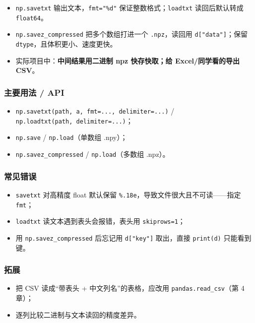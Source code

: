 \begin{itemize}
\tightlist
\item
  \texttt{np.savetxt} 输出文本，\texttt{fmt="\%d"}
  保证整数格式；\texttt{loadtxt} 读回后默认转成 \texttt{float64}。
\item
  \texttt{np.savez\_compressed} 把多个数组打进一个 \texttt{.npz}，读回用
  \texttt{d{[}"data"{]}}；保留 \texttt{dtype}，且体积更小、速度更快。
\item
  实际项目中：\textbf{中间结果用二进制 npz 快存快取；给
  Excel/同学看的导出 CSV}。
\end{itemize}

\subsubsection{主要用法 / API}\label{ux4e3bux8981ux7528ux6cd5-api-5}

\begin{itemize}
\tightlist
\item
  \texttt{np.savetxt(path,\ a,\ fmt=...,\ delimiter=...)} /
  \texttt{np.loadtxt(path,\ delimiter=...)}；
\item
  \texttt{np.save} / \texttt{np.load}（单数组 .npy）；
\item
  \texttt{np.savez\_compressed} / \texttt{np.load}（多数组 .npz）。
\end{itemize}

\subsubsection{常见错误}\label{ux5e38ux89c1ux9519ux8bef-5}

\begin{itemize}
\tightlist
\item
  \texttt{savetxt} 对高精度 float 默认保留
  \texttt{\%.18e}，导致文件很大且不可读------指定 \texttt{fmt}；
\item
  \texttt{loadtxt} 读文本遇到表头会报错，表头用 \texttt{skiprows=1}；
\item
  用 \texttt{np.savez\_compressed} 后忘记用 \texttt{d{[}"key"{]}}
  取出，直接 \texttt{print(d)} 只能看到键。
\end{itemize}

\subsubsection{拓展}\label{ux62d3ux5c55-5}

\begin{itemize}
\tightlist
\item
  把 CSV 读成``带表头 + 中文列名''的表格，应改用
  \texttt{pandas.read\_csv}（第 4 章）；
\item
  逐列比较二进制与文本读回的精度差异。
\end{itemize}

